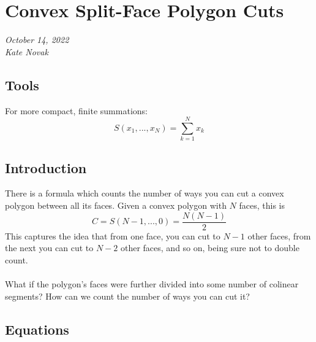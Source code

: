 \documentclass[12pt]{article}
\begin{document}
\section*{Convex Split-Face Polygon Cuts}
{\em{October 14, 2022}}\\
{\em{Kate Novak}}

\subsection*{Tools}

For more compact, finite summations:
\begin{equation}
    S(x_1,...,x_N) = \sum_{k=1}^{N} x_k
\end{equation}

\subsection*{Introduction}

There is a formula which counts the number of ways you can cut a convex polygon
between all its faces. Given a convex polygon with $N$ faces, this is
\begin{equation}
    C = S(N-1,...,0) = \frac{N (N - 1)}{2}
\end{equation}
This captures the idea that from one face, you can cut to $N-1$ other faces, from
the next you can cut to $N-2$ other faces, and so on, being sure not to double count.
\\
\\
What if the polygon's faces were further divided into some number of colinear
segments? How can we count the number of ways you can cut it?

\subsection*{Equations}
\end{document}
